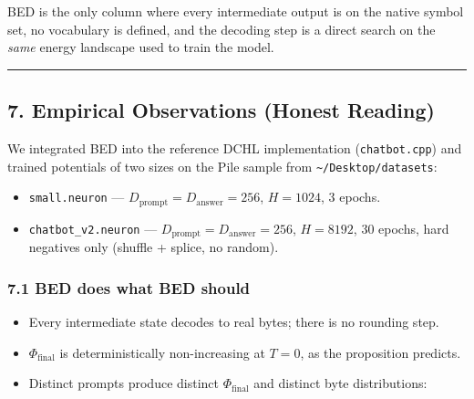 \documentclass[
  11pt,
  a4paper,
]{article}
\providecommand{\tightlist}{%
  \setlength{\itemsep}{0pt}\setlength{\parskip}{0pt}}
\begin{document}
BED is the only column where every intermediate output is on the native
symbol set, no vocabulary is defined, and the decoding step is a direct
search on the \emph{same} energy landscape used to train the model.

\begin{center}\rule{0.5\linewidth}{0.5pt}\end{center}

\subsection{7. Empirical Observations (Honest
Reading)}\label{empirical-observations-honest-reading}

We integrated BED into the reference DCHL implementation
(\texttt{chatbot.cpp}) and trained potentials of two sizes on the Pile
sample from \texttt{\textasciitilde{}/Desktop/datasets}:

\begin{itemize}
\tightlist
\item
  \texttt{small.neuron} ---
  \(D_{\text{prompt}} = D_{\text{answer}} = 256\), \(H = 1024\), 3
  epochs.
\item
  \texttt{chatbot\_v2.neuron} ---
  \(D_{\text{prompt}} = D_{\text{answer}} = 256\), \(H = 8192\), 30
  epochs, hard negatives only (shuffle + splice, no random).
\end{itemize}

\subsubsection{7.1 BED does what BED
should}\label{bed-does-what-bed-should}

\begin{itemize}
\tightlist
\item
  Every intermediate state decodes to real bytes; there is no rounding
  step.
\item
  \(\Phi_{\text{final}}\) is deterministically non-increasing at
  \(T = 0\), as the proposition predicts.
\item
  Distinct prompts produce distinct \(\Phi_{\text{final}}\) and distinct
  byte distributions:
\end{itemize}
\end{document}
